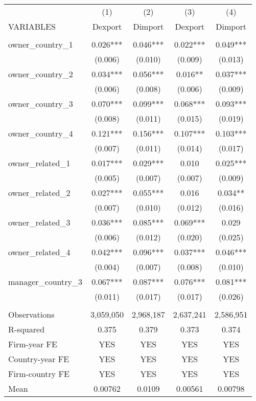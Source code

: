 \begin{tabular}{lcccc} \hline
 & (1) & (2) & (3) & (4) \\
VARIABLES & Dexport & Dimport & Dexport & Dimport \\ \hline
 &  &  &  &  \\
owner\_country\_1 & 0.026*** & 0.046*** & 0.022*** & 0.049*** \\
 & (0.006) & (0.010) & (0.009) & (0.013) \\
owner\_country\_2 & 0.034*** & 0.056*** & 0.016** & 0.037*** \\
 & (0.006) & (0.008) & (0.006) & (0.009) \\
owner\_country\_3 & 0.070*** & 0.099*** & 0.068*** & 0.093*** \\
 & (0.008) & (0.011) & (0.015) & (0.019) \\
owner\_country\_4 & 0.121*** & 0.156*** & 0.107*** & 0.103*** \\
 & (0.007) & (0.011) & (0.014) & (0.017) \\
owner\_related\_1 & 0.017*** & 0.029*** & 0.010 & 0.025*** \\
 & (0.005) & (0.007) & (0.007) & (0.009) \\
owner\_related\_2 & 0.027*** & 0.055*** & 0.016 & 0.034** \\
 & (0.007) & (0.010) & (0.012) & (0.016) \\
owner\_related\_3 & 0.036*** & 0.085*** & 0.069*** & 0.029 \\
 & (0.006) & (0.012) & (0.020) & (0.025) \\
owner\_related\_4 & 0.042*** & 0.096*** & 0.037*** & 0.046*** \\
 & (0.004) & (0.007) & (0.008) & (0.010) \\
manager\_country\_3 & 0.067*** & 0.087*** & 0.076*** & 0.081*** \\
 & (0.011) & (0.017) & (0.017) & (0.026) \\
 &  &  &  &  \\
Observations & 3,059,050 & 2,968,187 & 2,637,241 & 2,586,951 \\
R-squared & 0.375 & 0.379 & 0.373 & 0.374 \\
Firm-year FE & YES & YES & YES & YES \\
Country-year FE & YES & YES & YES & YES \\
Firm-country FE & YES & YES & YES & YES \\
 Mean & 0.00762 & 0.0109 & 0.00561 & 0.00798 \\ \hline
\end{tabular}

